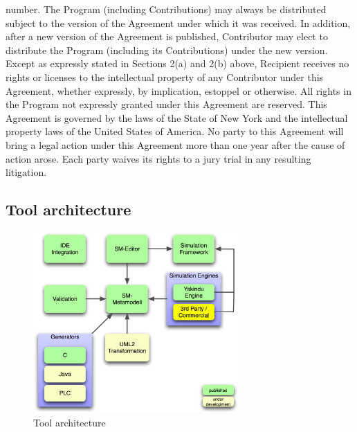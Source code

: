 number. The Program (including Contributions) may always be distributed
subject to the version of the Agreement under which it was received.
In addition, after a new version of the Agreement is published,
Contributor may elect to distribute the Program (including its
Contributions) under the new version. Except as expressly stated
in Sections 2(a) and 2(b) above, Recipient receives no rights
or licenses to the intellectual property of any Contributor under
this Agreement, whether expressly, by implication, estoppel or
otherwise. All rights in the Program not expressly granted under
this Agreement are reserved.
This Agreement is governed by the laws of the State of New York
and the intellectual property laws of the United States of America.
No party to this Agreement will bring a legal action under this
Agreement more than one year after the cause of action arose.
Each party waives its rights to a jury trial in any resulting
litigation.



\subsection{Tool architecture}
\begin{figure}[ht]
\center
\includegraphics[width=0.7\textwidth]{Pictures/ToolArchitektur}
\caption{\label{fig:toolArchitecture}Tool architecture}
\end{figure}
\clearpage

